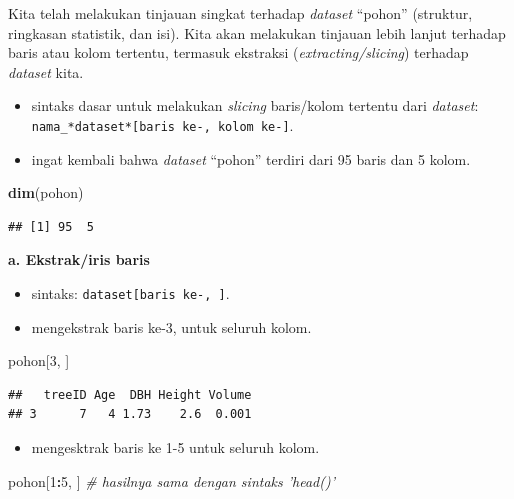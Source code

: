 \documentclass[
  12pt,
  a4paper,
]{scrbook}
\newenvironment{Shaded}{\begin{snugshade}}{\end{snugshade}}
\newcommand{\CommentTok}[1]{\textcolor[rgb]{0.56,0.35,0.01}{\textit{#1}}}
\newcommand{\DecValTok}[1]{\textcolor[rgb]{0.00,0.00,0.81}{#1}}
\newcommand{\KeywordTok}[1]{\textcolor[rgb]{0.13,0.29,0.53}{\textbf{#1}}}
\newcommand{\NormalTok}[1]{#1}
\newcommand{\OperatorTok}[1]{\textcolor[rgb]{0.81,0.36,0.00}{\textbf{#1}}}
\providecommand{\tightlist}{%
  \setlength{\itemsep}{0pt}\setlength{\parskip}{0pt}}
\begin{document}
Kita telah melakukan tinjauan singkat terhadap \emph{dataset} ``pohon''
(struktur, ringkasan statistik, dan isi). Kita akan melakukan tinjauan
lebih lanjut terhadap baris atau kolom tertentu, termasuk ekstraksi
(\emph{extracting/slicing}) terhadap \emph{dataset} kita.

\begin{itemize}
\tightlist
\item
  sintaks dasar untuk melakukan \emph{slicing} baris/kolom tertentu dari
  \emph{dataset}: \texttt{nama\_*dataset*{[}baris\ ke-,\ kolom\ ke-{]}}.
\item
  ingat kembali bahwa \emph{dataset} ``pohon'' terdiri dari 95 baris dan
  5 kolom.
\end{itemize}

\begin{Shaded}
\begin{Highlighting}[]
\KeywordTok{dim}\NormalTok{(pohon)}
\end{Highlighting}
\end{Shaded}

\begin{verbatim}
## [1] 95  5
\end{verbatim}

\textbf{a. Ekstrak/iris baris}

\begin{itemize}
\tightlist
\item
  sintaks: \texttt{dataset{[}baris\ ke-,\ {]}}.
\item
  mengekstrak baris ke-3, untuk seluruh kolom.
\end{itemize}

\begin{Shaded}
\begin{Highlighting}[]
\NormalTok{pohon[}\DecValTok{3}\NormalTok{, ]}
\end{Highlighting}
\end{Shaded}

\begin{verbatim}
##   treeID Age  DBH Height Volume
## 3      7   4 1.73    2.6  0.001
\end{verbatim}

\begin{itemize}
\tightlist
\item
  mengesktrak baris ke 1-5 untuk seluruh kolom.
\end{itemize}

\begin{Shaded}
\begin{Highlighting}[]
\NormalTok{pohon[}\DecValTok{1}\OperatorTok{:}\DecValTok{5}\NormalTok{, ]  }\CommentTok{# hasilnya sama dengan sintaks 'head()'}
\end{Highlighting}
\end{Shaded}
\end{document}
